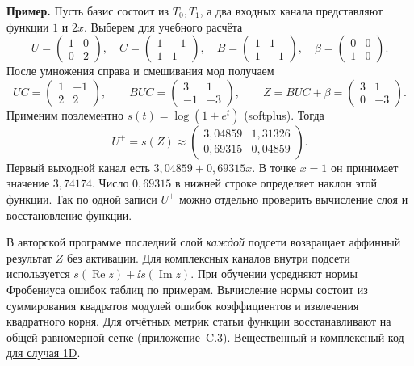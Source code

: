 \clearpage
\textbf{Пример.}
Пусть базис состоит из $T_0,T_1$, а два входных канала представляют
функции $1$ и $2x$. Выберем для учебного расчёта
\[
 U=\begin{pmatrix}1&0\\0&2\end{pmatrix},\quad
 C=\begin{pmatrix}1&-1\\1&1\end{pmatrix},\quad
 B=\begin{pmatrix}1&1\\1&-1\end{pmatrix},\quad
 \beta=\begin{pmatrix}0&0\\1&0\end{pmatrix}.
\]
После умножения справа и смешивания мод получаем
\[
 UC=\begin{pmatrix}1&-1\\2&2\end{pmatrix},
 \qquad BUC=\begin{pmatrix}3&1\\-1&-3\end{pmatrix},
 \qquad Z=BUC+\beta=\begin{pmatrix}3&1\\0&-3\end{pmatrix}.
\]
Применим поэлементно $s(t)=\log(1+e^t)$ (softplus). Тогда
\[
 U^+=s(Z)\approx\begin{pmatrix}3{,}04859&1{,}31326\\0{,}69315&0{,}04859\end{pmatrix}.
\]
Первый выходной канал есть $3{,}04859+0{,}69315x$. В точке $x=1$
он принимает значение $3{,}74174$. Число $0{,}69315$ в нижней строке
определяет наклон этой функции. Так по одной записи $U^+$
можно отдельно проверить вычисление слоя и восстановление функции.

В авторской программе последний слой \emph{каждой} подсети возвращает
аффинный результат $Z$ без активации. Для комплексных каналов внутри подсети
используется $s(\operatorname{Re}z)+\ii s(\operatorname{Im}z)$.
При обучении усредняют нормы Фробениуса ошибок таблиц по примерам.
Вычисление нормы состоит из суммирования квадратов модулей ошибок
коэффициентов и извлечения квадратного корня. Для отчётных метрик
статьи функции восстанавливают на общей равномерной сетке
(приложение~C.3).
\href{https://github.com/VLSF/SNO/blob/4362226284f22f6f456d429ec4ddec5b8596e894/architectures/SNO_1D.py}{Вещественный}
и
\href{https://github.com/VLSF/SNO/blob/4362226284f22f6f456d429ec4ddec5b8596e894/architectures/fSNO_1D.py}{комплексный код для случая 1D}.

